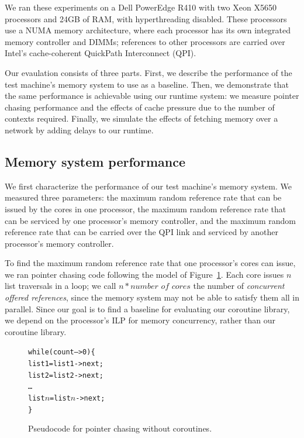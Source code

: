 \documentclass{acm_proc_article-sp}
\begin{document}
We ran these experiments on a Dell PowerEdge R410 with two Xeon X5650
processors and 24GB of RAM, with hyperthreading disabled. These
processors use a NUMA memory architecture, where each processor has
its own integrated memory controller and DIMMs; references to other
processors are carried over Intel's cache-coherent QuickPath
Interconnect (QPI).

Our evaulation consists of three parts. First, we describe the
performance of the test machine's memory system to use as a
baseline. Then, we demonstrate that the same performance is achievable
using our runtime system: we measure pointer chasing performance and
the effects of cache pressure due to the number of contexts
required. Finally, we simulate the effects of fetching memory over a
network by adding delays to our runtime.

\subsection{Memory system performance}

We first characterize the performance of our test machine's memory
system. We measured three parameters: the maximum random reference
rate that can be issued by the cores in one processor, the maximum random
reference rate that can be serviced by one processor's memory controller,
and the maximum random reference rate that can be carried over the QPI
link and serviced by another processor's memory controller.

To find the maximum random reference rate that one processor's cores
can issue, we ran pointer chasing code following the model of
Figure~\ref{fig:pointernocoro}. Each core issues $n$ list traversals
in a loop; we call $n * \textit{number of cores}$ the number of
{\em concurrent offered references}, since the memory system may not
be able to satisfy them all in parallel. Since our goal is to find a
baseline for evaluating our coroutine library, we depend on the
processor's ILP for memory concurrency, rather than our coroutine
library.

\begin{figure}
\begin{alltt}
  while (count-- > 0) \{
    list1 = list1->next;
    list2 = list2->next;
    \ldots
    list\(n\) = list\(n\)->next;
  \}
\end{alltt}
\caption{Pseudocode for pointer chasing without coroutines.}
\label{fig:pointernocoro}
\end{figure}
\end{document}
